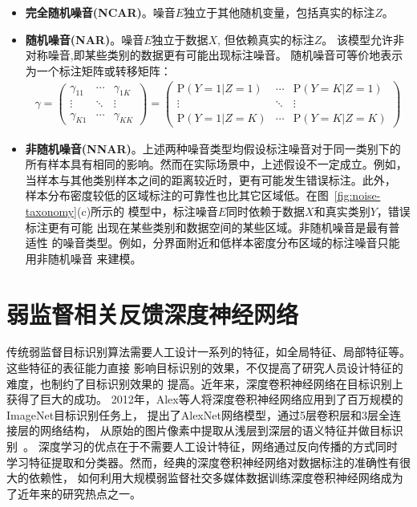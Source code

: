 \documentclass[doctor]{ustcthesis}
\def \P   {\mathrm{P}}
\begin{document}
\begin{itemize}
    \item \textbf{完全随机噪音(NCAR)}。噪音$E$独立于其他随机变量，包括真实的标注$Z$。
    \item \textbf{随机噪音(NAR)}。噪音$E$独立于数据$X$, 但依赖真实的标注$Z$。
        该模型允许非对称噪音,即某些类别的数据更有可能出现标注噪音。
        随机噪音可等价地表示为一个标注矩阵或转移矩阵：
        \begin{eqnarray}
            \gamma =
            \begin{pmatrix}
                \gamma_{11} & \cdots & \gamma_{1K} \\
                \vdots & \ddots & \vdots \\
                \gamma_{K1} & \cdots & \gamma_{KK}
            \end{pmatrix}
            =
            \begin{pmatrix}
                \P(Y = 1|Z=1) & \cdots & \P(Y= K|Z=1) \\
                \vdots & \ddots & \vdots \\
                \P(Y = 1|Z=K) & \cdots & \P(Y = K|Z=K)
            \end{pmatrix}
        \end{eqnarray}
    \item \textbf{非随机噪音(NNAR)}。上述两种噪音类型均假设标注噪音对于同一类别下的
        所有样本具有相同的影响。然而在实际场景中，上述假设不一定成立。例如，
        当样本与其他类别样本之间的距离较近时，更有可能发生错误标注。此外，
        样本分布密度较低的区域标注的可靠性也比其它区域低。在图~\ref{fig:noise-taxonomy}(c)所示的
        模型中，标注噪音$E$同时依赖于数据$X$和真实类别$Y$，错误标注更有可能
        出现在某些类别和数据空间的某些区域。非随机噪音是最有普适性
        的噪音类型。例如，分界面附近和低样本密度分布区域的标注噪音只能用非随机噪音
        来建模。
\end{itemize}

\section{弱监督相关反馈深度神经网络}
传统弱监督目标识别算法需要人工设计一系列的特征，如全局特征、局部特征等。这些特征的表征能力直接
影响目标识别的效果，不仅提高了研究人员设计特征的难度，也制约了目标识别效果的
提高。近年来，深度卷积神经网络在目标识别上获得了巨大的成功。
2012年，Alex等人将深度卷积神经网络应用到了百万规模的ImageNet目标识别任务上，
提出了AlexNet网络模型，通过5层卷积层和3层全连接层的网络结构，
从原始的图片像素中提取从浅层到深层的语义特征并做目标识别~\cite{krizhevsky2012imagenet}。
深度学习的优点在于不需要人工设计特征，网络通过反向传播的方式同时
学习特征提取和分类器。然而，经典的深度卷积神经网络对数据标注的准确性有很大的依赖性，
如何利用大规模弱监督社交多媒体数据训练深度卷积神经网络成为了近年来的研究热点之一。
\end{document}

